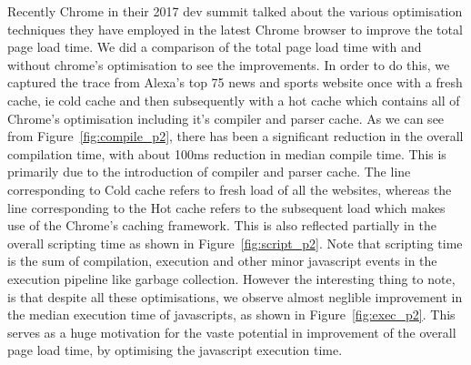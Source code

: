 Recently Chrome in their 2017 dev summit talked about the various optimisation techniques
they have employed in the latest Chrome browser to improve the total page load time.
We did a comparison of the total page load time with and without chrome's optimisation to see
the improvements. In order to do this, we captured the trace from Alexa's top 75 
news and sports website once with a fresh cache, ie cold cache and then subsequently with a hot
cache which contains all of Chrome's optimisation including it's compiler and parser cache. 
As we can see from Figure~\ref{fig:compile_p2}, there has been a significant reduction in the overall compilation
time, with about 100ms reduction in median compile time. This is primarily due to the introduction of compiler and parser cache. 
The line corresponding to Cold cache refers to fresh load of all the websites,
whereas the line corresponding to the Hot cache refers to the subsequent load
which makes use of the Chrome's caching framework. 
This is also reflected partially in the overall scripting time
as shown in Figure~\ref{fig:script_p2}. Note that scripting time is the sum of compilation, execution and other
minor javascript events in the execution pipeline like garbage collection. 
However the interesting thing to note, is that despite all these optimisations,
we observe almost neglible improvement in the median execution time of javascripts, as
shown in Figure~\ref{fig:exec_p2}. This serves as a huge motivation
for the vaste potential in
improvement of the overall page load time, by optimising the javascript execution
time.


